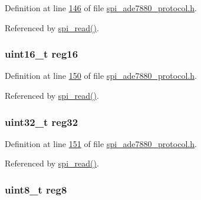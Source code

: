 Definition at line \hyperlink{a00041_source_l00146}{146} of file \hyperlink{a00041_source}{spi\-\_\-ade7880\-\_\-protocol.\-h}.



Referenced by \hyperlink{a00040_source_l00147}{spi\-\_\-read()}.

\hypertarget{a00016_a0c22d234d52e616d449a8c264bf2030b}{
\subsubsection[{reg16}]{\setlength{\rightskip}{0pt plus 5cm}uint16\-\_\-t reg16}}\label{d7/d7a/a00016_a0c22d234d52e616d449a8c264bf2030b}


Definition at line \hyperlink{a00041_source_l00150}{150} of file \hyperlink{a00041_source}{spi\-\_\-ade7880\-\_\-protocol.\-h}.



Referenced by \hyperlink{a00040_source_l00147}{spi\-\_\-read()}.

\hypertarget{a00016_a83e2be8d3feb1bcbc286bfaae10ac552}{
\subsubsection[{reg32}]{\setlength{\rightskip}{0pt plus 5cm}uint32\-\_\-t reg32}}\label{d7/d7a/a00016_a83e2be8d3feb1bcbc286bfaae10ac552}


Definition at line \hyperlink{a00041_source_l00151}{151} of file \hyperlink{a00041_source}{spi\-\_\-ade7880\-\_\-protocol.\-h}.



Referenced by \hyperlink{a00040_source_l00147}{spi\-\_\-read()}.

\hypertarget{a00016_a90b3f782e917edca7101e7803a3773b7}{
\subsubsection[{reg8}]{\setlength{\rightskip}{0pt plus 5cm}uint8\-\_\-t reg8}}\label{d7/d7a/a00016_a90b3f782e917edca7101e7803a3773b7}



